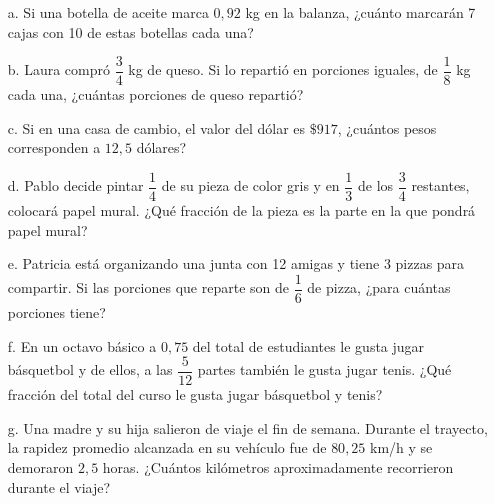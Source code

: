 \documentclass[spanish,letterpaper, 11pt, addpoints, answers]{exam}
\begin{document}
\begin{questions}
\begin{itemize}
  \item[a.] Si una botella de aceite marca $0{,}92$ kg en la balanza, ¿cuánto marcarán 7 cajas con 10 de estas botellas cada una?
  \item[b.] Laura compró $\dfrac{3}{4}$ kg de queso. Si lo repartió en porciones iguales, de $\dfrac{1}{8}$ kg cada una, ¿cuántas porciones de queso repartió?
  \item[c.] Si en una casa de cambio, el valor del dólar es $\$917$, ¿cuántos pesos corresponden a $12{,}5$ dólares?
  \item[d.] Pablo decide pintar $\dfrac{1}{4}$ de su pieza de color gris y en $\dfrac{1}{3}$ de los $\dfrac{3}{4}$ restantes, colocará papel mural. ¿Qué fracción de la pieza es la parte en la que pondrá papel mural?
  \item[e.] Patricia está organizando una junta con 12 amigas y tiene 3 pizzas para compartir. Si las porciones que reparte son de $\dfrac{1}{6}$ de pizza, ¿para cuántas porciones tiene?
  \item[f.] En un octavo básico a $0{,}75$ del total de estudiantes le gusta jugar básquetbol y de ellos, a las $\dfrac{5}{12}$ partes también le gusta jugar tenis. ¿Qué fracción del total del curso le gusta jugar básquetbol y tenis?
  \item[g.] Una madre y su hija salieron de viaje el fin de semana. Durante el trayecto, la rapidez promedio alcanzada en su vehículo fue de $80{,}25$ km/h y se demoraron $2{,}5$ horas. ¿Cuántos kilómetros aproximadamente recorrieron durante el viaje? 
\end{itemize}
\end{questions}
\end{document}
